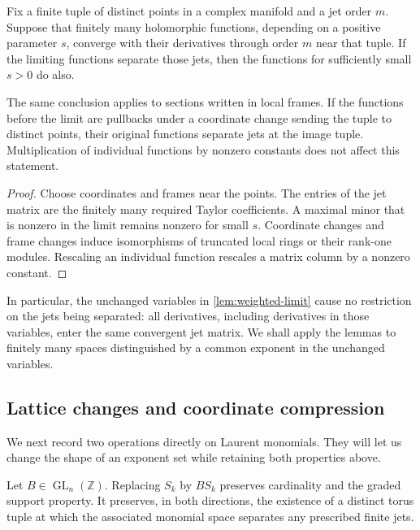 \begin{lemma}\label{lem:rank-transfer}
Fix a finite tuple of distinct points in a complex manifold and a jet order $m$. Suppose that finitely many holomorphic functions, depending on a positive parameter $s$, converge with their derivatives through order $m$ near that tuple. If the limiting functions separate those jets, then the functions for sufficiently small $s>0$ do also.

The same conclusion applies to sections written in local frames. If the functions before the limit are pullbacks under a coordinate change sending the tuple to distinct points, their original functions separate jets at the image tuple. Multiplication of individual functions by nonzero constants does not affect this statement.
\end{lemma}

\begin{proof}
Choose coordinates and frames near the points. The entries of the jet matrix are the finitely many required Taylor coefficients. A maximal minor that is nonzero in the limit remains nonzero for small $s$. Coordinate changes and frame changes induce isomorphisms of truncated local rings or their rank-one modules. Rescaling an individual function rescales a matrix column by a nonzero constant.
\end{proof}

In particular, the unchanged variables in \cref{lem:weighted-limit} cause no restriction on the jets being separated: all derivatives, including derivatives in those variables, enter the same convergent jet matrix. We shall apply the lemmas to finitely many spaces distinguished by a common exponent in the unchanged variables.

\subsection{Lattice changes and coordinate compression}

We next record two operations directly on Laurent monomials. They will let us change the shape of an exponent set while retaining both properties above.

\begin{lemma}\label{lem:unimodular}
Let $B\in\operatorname{GL}_n(\mathbb{Z})$. Replacing $S_k$ by $BS_k$ preserves cardinality and the graded support property. It preserves, in both directions, the existence of a distinct torus tuple at which the associated monomial space separates any prescribed finite jets.
\end{lemma}

